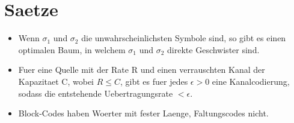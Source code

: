 \documentclass[a4paper]{scrreprt}
\begin{document}
\section{Saetze}
\begin{itemize}
	\item Wenn $\sigma_1$ und $\sigma_2$ die unwahrscheinlichsten Symbole sind, so gibt es einen optimalen Baum, in welchem $\sigma_1$ und $\sigma_2$ direkte Geschwister sind.
	\item Fuer eine Quelle mit der Rate R und einen verrauschten Kanal der Kapazitaet C, wobei $R \le C$, gibt es fuer jedes $\epsilon > 0$ eine Kanalcodierung, sodass die entstehende Uebertragungsrate $< \epsilon$.
	\item Block-Codes haben Woerter mit fester Laenge, Faltungscodes nicht.
\end{itemize}
\end{document}
